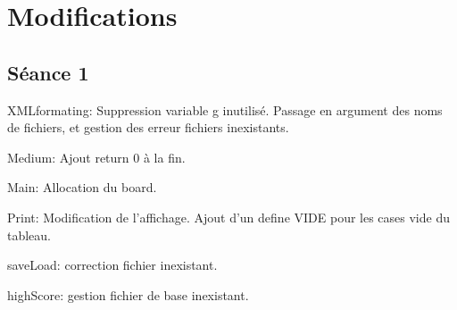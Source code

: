 \documentclass[12pt,a4paper,twoside]{article}
\begin{document}
\section{Modifications}
\subsection{Séance 1}

XMLformating: Suppression variable g inutilisé. Passage en argument des noms de fichiers, et gestion des erreur fichiers inexistants.

Medium: Ajout return 0 à la fin.

Main: Allocation du board.

Print: Modification de l'affichage. Ajout d'un define VIDE pour les cases vide du tableau.

saveLoad: correction fichier inexistant.

highScore: gestion fichier de base inexistant.
\end{document}
